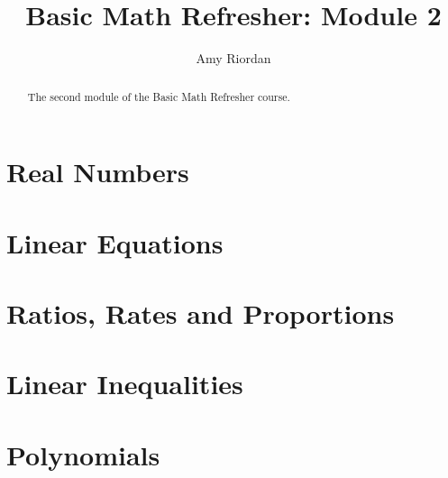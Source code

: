 \documentclass{xourse}
\title{Basic Math Refresher: Module 2}
\author{Amy Riordan}
\begin{document}
\begin{abstract}
    The second module of the Basic Math Refresher course.
\end{abstract}
\maketitle

\part{Real Numbers}


\part{Linear Equations}


\part{Ratios, Rates and Proportions}


\part{Linear Inequalities}


\part{Polynomials}

\end{document}
